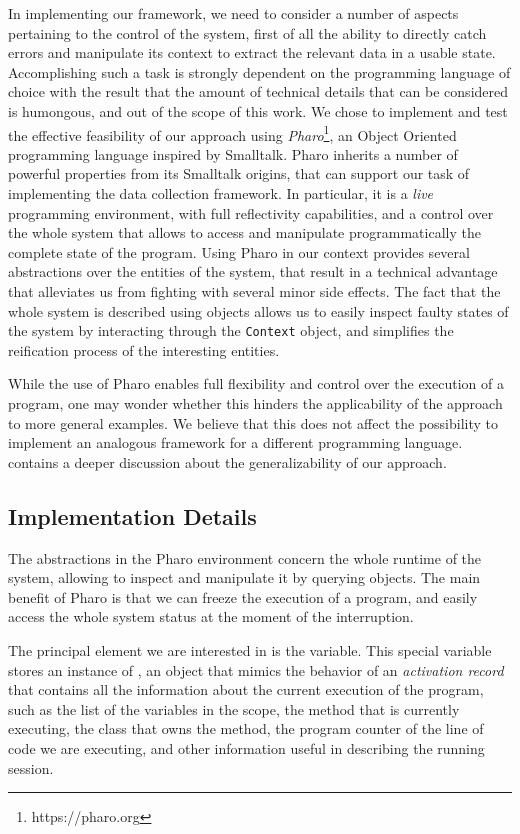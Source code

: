 In implementing our framework, we need to consider a number of aspects pertaining to the control of the system, first of all the ability to directly catch errors and manipulate its context to extract the relevant data in a usable state. Accomplishing such a task is strongly dependent on the programming language of choice with the result that the amount of technical details that can be considered is humongous, and out of the scope of this work. We chose to implement and test the effective feasibility of our approach using \emph{Pharo}\footnote{https://pharo.org}, an Object Oriented programming language inspired by Smalltalk. Pharo inherits a number of powerful properties from its Smalltalk origins, that can support our task of implementing the data collection framework. In particular, it is a \emph{live} programming environment, with full reflectivity capabilities, and a control over the whole system that allows to access and manipulate programmatically the complete state of the program.
Using Pharo in our context provides several abstractions over the entities of the system, that result in a technical advantage that alleviates us from fighting with several minor side effects. The fact that the whole system is described using objects allows us to easily inspect faulty states of the system by interacting through the \texttt{Context} object, and simplifies the reification process of the interesting entities.

While the use of Pharo enables full flexibility and control over the execution of a program, one may wonder whether this hinders the applicability of the approach to more general examples.
We believe that this does not affect the possibility to implement an analogous framework for a different programming language.  contains a deeper discussion about the generalizability of our approach.

\subsection{Implementation Details}

The abstractions in the Pharo environment concern the whole runtime of the system, allowing to inspect and manipulate it by querying objects. The main benefit of Pharo is that we can freeze the execution of a program, and easily access the whole system status at the moment of the interruption.

The principal element we are interested in is the  variable. This special variable stores an instance of , an object that mimics the behavior of an \textit{activation record} that contains all the information about the current execution of the program, such as the list of the variables in the scope, the method that is currently executing, the class that owns the method, the program counter of the line of code we are executing, and other information useful in describing the running session.

